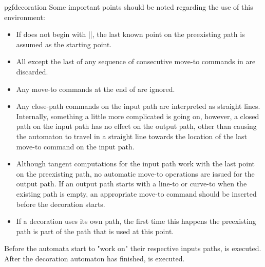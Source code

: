 \begin{environment}{{pgfdecoration}}
    Some important points should be noted regarding the use of this
    environment:
    \begin{itemize}
        \item If  does not begin with
            |\pgfpathmoveto|, the last known point on the preexisting path is
            assumed as the starting point.
        \item All except the last of any sequence of consecutive move-to
            commands in  are discarded.
        \item Any move-to commands at the end of 
            are ignored.
        \item Any close-path commands on the input path are interpreted as
            straight lines. Internally, something a little more complicated is
            going on, however, a closed path on the input path has no effect on
            the output path, other than causing the automaton to travel in a
            straight line towards the location of the last move-to command on
            the input path.
        \item Although tangent computations for the input path work with the
            last point on the preexisting path, no automatic move-to operations
            are issued for the output path. If an output path starts with a
            line-to or curve-to when the existing path is empty, an appropriate
            move-to command should be inserted before the decoration starts.
        \item If a decoration uses its own path, the first time this happens
            the preexisting path is part of the path that is used at this
            point.
    \end{itemize}

    Before the automata start to "work on" their respective inputs paths,
     is executed. After the decoration automaton has
    finished,  is executed.
\begin{codeexample}[]
\end{codeexample}


\end{environment}
